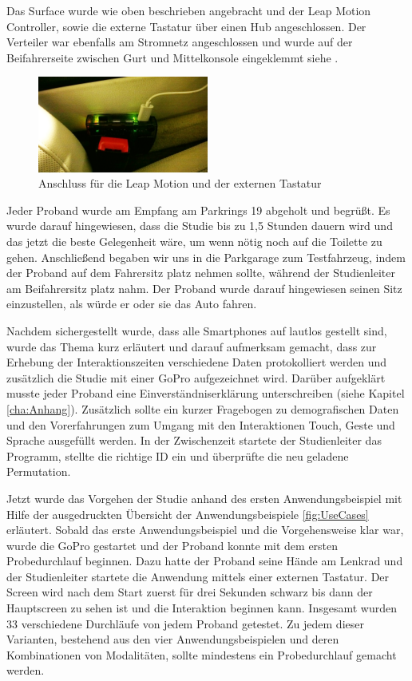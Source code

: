 Das Surface wurde wie oben beschrieben angebracht und der Leap Motion Controller, sowie die externe Tastatur über einen Hub angeschlossen. 
Der Verteiler war ebenfalls am Stromnetz angeschlossen und wurde auf der Beifahrerseite zwischen Gurt und Mittelkonsole eingeklemmt siehe . 
\begin{figure}[ht]
  \centering
  \includegraphics[width=0.5\textwidth]{img/Hub.jpg}
  \caption{Anschluss für die Leap Motion und der externen Tastatur}
  \label{fig:Hub}
\end{figure} 

Jeder Proband wurde am Empfang am Parkrings 19 abgeholt und begrüßt.
Es wurde darauf hingewiesen, dass die Studie bis zu 1,5 Stunden dauern wird und das jetzt die beste Gelegenheit wäre, um wenn nötig noch auf die Toilette zu gehen.
Anschließend begaben wir uns in die Parkgarage zum Testfahrzeug, indem der Proband auf dem Fahrersitz platz nehmen sollte, während der Studienleiter am Beifahrersitz platz nahm.
Der Proband wurde darauf hingewiesen seinen Sitz einzustellen, als würde er oder sie das Auto fahren.

Nachdem sichergestellt wurde, dass alle Smartphones auf lautlos gestellt sind, wurde das Thema kurz erläutert und darauf aufmerksam gemacht, dass zur Erhebung der Interaktionszeiten verschiedene Daten protokolliert werden und zusätzlich die Studie mit einer GoPro aufgezeichnet wird.
Darüber aufgeklärt musste jeder Proband eine Einverständniserklärung unterschreiben (siehe Kapitel \ref{cha:Anhang}).
Zusätzlich sollte ein kurzer Fragebogen zu demografischen Daten und den Vorerfahrungen zum Umgang mit den Interaktionen Touch, Geste und Sprache ausgefüllt werden.
In der Zwischenzeit startete der Studienleiter das Programm, stellte die richtige ID ein und überprüfte die neu geladene Permutation.

Jetzt wurde das Vorgehen der Studie anhand des ersten Anwendungsbeispiel mit Hilfe der ausgedruckten Übersicht der Anwendungsbeispiele \ref{fig:UseCases} erläutert.
Sobald das erste Anwendungsbeispiel und die Vorgehensweise klar war, wurde die GoPro gestartet und der Proband konnte mit dem ersten Probedurchlauf beginnen. Dazu hatte der Proband seine Hände am Lenkrad und der Studienleiter startete die Anwendung mittels einer externen Tastatur. 
Der Screen wird nach dem Start zuerst für drei Sekunden schwarz bis dann der Hauptscreen zu sehen ist und die Interaktion beginnen kann.
Insgesamt wurden 33 verschiedene Durchläufe von jedem Proband getestet.
Zu jedem dieser Varianten, bestehend aus den vier Anwendungsbeispielen und deren Kombinationen von Modalitäten, sollte mindestens ein Probedurchlauf gemacht werden.

